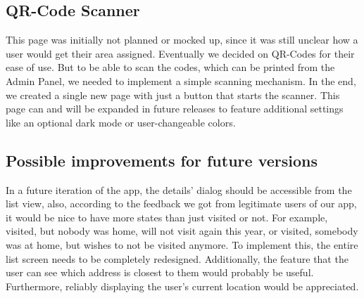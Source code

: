\subsection{QR-Code Scanner}
This page was initially not planned or mocked up, since it was still unclear how a user would get their area assigned. Eventually we decided on QR-Codes for their ease of use. But to be able to scan the codes, which can be printed from the Admin Panel, we needed to implement a simple scanning mechanism. In the end, we created a single new page with just a button that starts the scanner. This page can and will be expanded in future releases to feature additional settings like an optional dark mode or user-changeable colors. 

\subsection{Possible improvements for future versions}

In a future iteration of the app, the details' dialog should be accessible from the list view, also, according to the feedback we got from legitimate users of our app, it would be nice to have more states than just visited or not. For example, visited, but nobody was home, will not visit again this year, or visited, somebody was at home, but wishes to not be visited anymore. To implement this, the entire list screen needs to be completely redesigned. Additionally, the feature that the user can see which address is closest to them would probably be useful. Furthermore, reliably displaying the user's current location would be appreciated.

\newpage